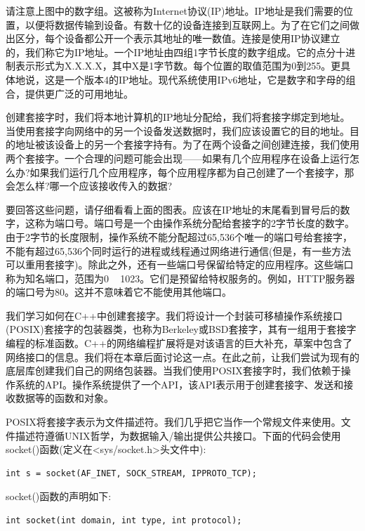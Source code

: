 请注意上图中的数字组。这被称为Internet协议(IP)地址。IP地址是我们需要的位置，以便将数据传输到设备。有数十亿的设备连接到互联网上。为了在它们之间做出区分，每个设备都公开一个表示其地址的唯一数值。连接是使用IP协议建立的，我们称它为IP地址。一个IP地址由四组1字节长度的数字组成。它的点分十进制表示形式为X.X.X.X，其中X是1字节数。每个位置的取值范围为0到255。更具体地说，这是一个版本4的IP地址。现代系统使用IPv6地址，它是数字和字母的组合，提供更广泛的可用地址。 \par
创建套接字时，我们将本地计算机的IP地址分配给，我们将套接字绑定到地址。当使用套接字向网络中的另一个设备发送数据时，我们应该设置它的目的地址。目的地址被该设备上的另一个套接字持有。为了在两个设备之间创建连接，我们使用两个套接字。一个合理的问题可能会出现——如果有几个应用程序在设备上运行怎么办?如果我们运行几个应用程序，每个应用程序都为自己创建了一个套接字，那会怎么样?哪一个应该接收传入的数据? \par
要回答这些问题，请仔细看看上面的图表。应该在IP地址的末尾看到冒号后的数字，这称为端口号。端口号是一个由操作系统分配给套接字的2字节长度的数字。由于2字节的长度限制，操作系统不能分配超过65,536个唯一的端口号给套接字，不能有超过65,536个同时运行的进程或线程通过网络进行通信(但是，有一些方法可以重用套接字)。除此之外，还有一些端口号保留给特定的应用程序。这些端口称为知名端口，范围为0 ~ 1023。它们是预留给特权服务的。例如，HTTP服务器的端口号为80。这并不意味着它不能使用其他端口。 \par
我们学习如何在C++中创建套接字。我们将设计一个封装可移植操作系统接口(POSIX)套接字的包装器类，也称为Berkeley或BSD套接字，其有一组用于套接字编程的标准函数。C++的网络编程扩展将是对该语言的巨大补充，草案中包含了网络接口的信息。我们将在本章后面讨论这一点。在此之前，让我们尝试为现有的底层库创建我们自己的网络包装器。当我们使用POSIX套接字时，我们依赖于操作系统的API。操作系统提供了一个API，该API表示用于创建套接字、发送和接收数据等的函数和对象。 \par
POSIX将套接字表示为文件描述符。我们几乎把它当作一个常规文件来使用。文件描述符遵循UNIX哲学，为数据输入/输出提供公共接口。下面的代码会使用socket()函数(定义在<sys/socket.h>头文件中): \par

\begin{lstlisting}[caption={}]
int s = socket(AF_INET, SOCK_STREAM, IPPROTO_TCP);
\end{lstlisting}

socket()函数的声明如下: \par

\begin{lstlisting}[caption={}]
int socket(int domain, int type, int protocol);
\end{lstlisting}

